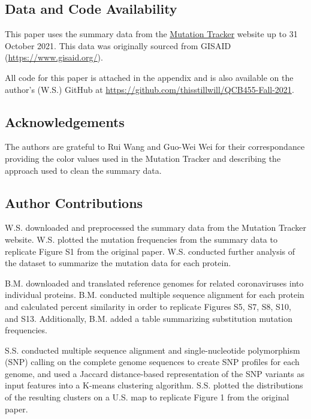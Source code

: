 \documentclass{article}
\begin{document}
\hypertarget{data-and-code-availability}{%
\subsection*{Data and Code
Availability}\label{data-and-code-availability}}

This paper uses the summary data from the
\href{https://users.math.msu.edu/users/weig/SARS-CoV-2_Mutation_Tracker.html}{Mutation
Tracker} website up to 31 October 2021. This data was originally sourced
from GISAID (\url{https://www.gisaid.org/}).

All code for this paper is attached in the appendix and is also
available on the author's (W.S.) GitHub at
\url{https://github.com/thisstillwill/QCB455-Fall-2021}.

\hypertarget{acknowledgements}{%
\subsection*{Acknowledgements}\label{acknowledgements}}

The authors are grateful to Rui Wang and Guo-Wei Wei for their
correspondance providing the color values used in the Mutation Tracker
and describing the approach used to clean the summary data.

\hypertarget{author-contributions}{%
\subsection*{Author Contributions}\label{author-contributions}}

W.S. downloaded and preprocessed the summary data from the Mutation
Tracker website. W.S. plotted the mutation frequencies from the summary
data to replicate Figure S1 from the original paper. W.S. conducted
further analysis of the dataset to summarize the mutation data for each
protein.

B.M. downloaded and translated reference genomes for related
coronaviruses into individual proteins. B.M. conducted multiple sequence
alignment for each protein and calculated percent similarity in order to
replicate Figures S5, S7, S8, S10, and S13. Additionally, B.M. added a
table summarizing substitution mutation frequencies.

S.S. conducted multiple sequence alignment and single-nucleotide
polymorphism (SNP) calling on the complete genome sequences to create
SNP profiles for each genome, and used a Jaccard distance-based
representation of the SNP variants as input features into a K-means
clustering algorithm. S.S. plotted the distributions of the resulting
clusters on a U.S. map to replicate Figure 1 from the original paper.
\end{document}
